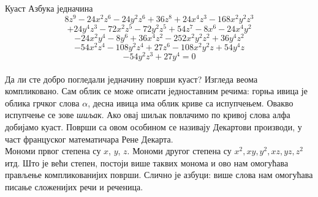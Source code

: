\begin{surferPage}{Куаст}
Азбука једначина
  \smallskip
\[8z^9-24x^2z^6-24y^2z^6+36z^8+24x^4z^3-168x^2y^2z^3\]
\[+24y^4z^3-72x^2z^5-72y^2z^5+54z^7-8x^6-24x^4y^2\]
\[-24x^2y^4-8y^6 + 36x^4z^2-252x^2y^2z^2+36y^4z^2\]
\[- 54x^2z^4-108y^2z^4 + 27z^6-108x^2y^2z + 54y^4z\]
\[-54y^2z^3 + 27y^4 = 0\]\\
\vspace{0.3cm}
Да ли сте добро погледали једначину површи куаст? Изгледа веома компликовано. Сам облик се може описати једноставним речима: горња ивица је облика грчког слова $\alpha$, десна ивица има облик криве са испупчењем. Овакво испупчење се зове {\it шиљак}. Ако овај шиљак  повлачимо по кривој слова алфа добијамо куаст. Површи са овом особином се називају Декартови производи, у част француског математичара Рене Декарта.\\
\vspace{0.3cm}
Мономи првог степена су $x$, $y$, $z$. Мономи другог степена су $x^2, xy, y^2, xz, yz, z^2$ итд. Што је већи степен, постоји више таквих монома и ово нам омогућава прављење компликованијих површи. Слично је азбуци: више слова нам омогућава писање сложенијих речи и реченица.
\end{surferPage}
